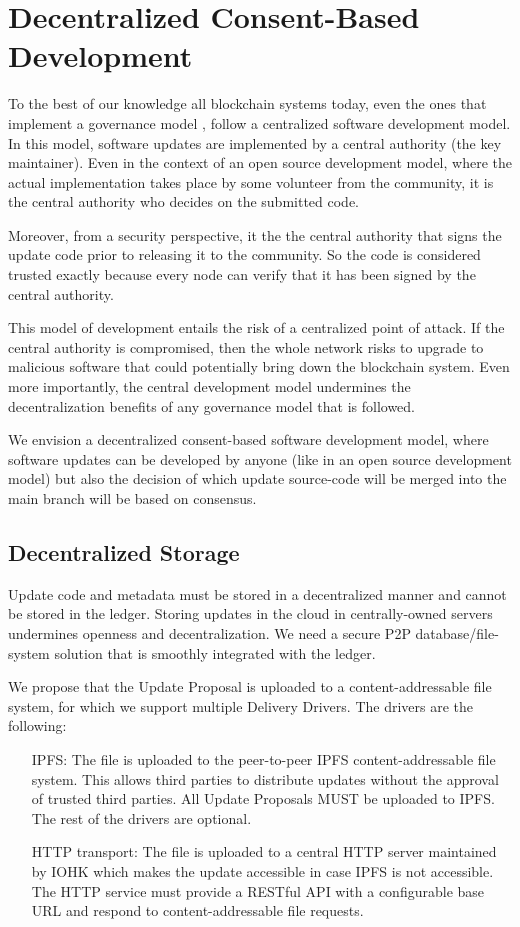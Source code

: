 \section{Decentralized Consent-Based Development}
To the best of our knowledge all blockchain systems today, even the ones that implement a governance model \citep{decred, dash}, follow a centralized software development model. In this model, software updates are implemented by a central authority (the key maintainer). Even in the context of an open source development model, where the actual implementation takes place by some volunteer from the community, it is the central authority who decides on the submitted code. 

Moreover, from a security perspective, it the the central authority that signs the update code prior to releasing it to the community. So the code is considered trusted exactly because every node can verify that it has been signed by the central authority.

This model of development entails the risk of a centralized point of attack. If the central authority is compromised, then the whole network risks to upgrade to malicious software that could potentially bring down the blockchain system. Even more importantly, the central development model undermines the decentralization benefits of any governance model that is followed.

We envision a decentralized consent-based software development model, where software updates can be developed by anyone (like in an open source development model) but also the decision of which update source-code will be merged into the main branch will be based on consensus. 

\subsection*{Decentralized Storage}
Update code and metadata must be stored in a decentralized manner and cannot be stored in the ledger. Storing updates in the cloud in centrally-owned servers undermines openness and decentralization. We need a secure P2P database/file-system solution that is smoothly integrated with the ledger.

We propose that the Update Proposal is uploaded to a content-addressable \cite{contentaddr} file system, for which we support multiple Delivery Drivers. The drivers are the following:

\begin{itemize}
\item[IPFS:]The file is uploaded to the peer-to-peer IPFS content-addressable file system. This allows third parties to distribute updates without the approval of trusted third parties. All Update Proposals MUST be uploaded to IPFS. The rest of the drivers are optional.

\item[HTTP transport:] The file is uploaded to a central HTTP server maintained by IOHK which makes the update accessible in case IPFS is not accessible. The HTTP service must provide a RESTful API with a configurable base URL and respond to content-addressable file requests.
\end{itemize}

